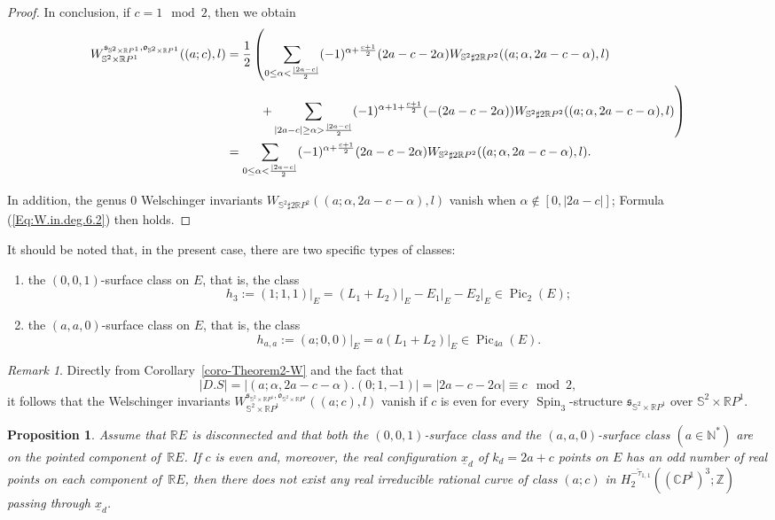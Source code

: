 \documentclass[11pt]{amsart}
\numberwithin{equation}{section}
\theoremstyle{definition}
\theoremstyle{plain}
\newtheorem{proposition}[definition]{Proposition}
\theoremstyle{remark}
\newtheorem{remark}[definition]{Remark}
\newcommand{\R}{\mathbb{R}}
\newcommand{\Z}{\mathbb{Z}}
\newcommand{\C}{\mathbb{C}}
\DeclareMathOperator{\Pic}{Pic}
\DeclareMathOperator{\Spin}{Spin}
\begin{document}
\begin{proof}
In conclusion, if $c= 1 \mod 2$, then we obtain
\begin{align*}
     W_{\mathbb{S}^2 \times \R P^1}^{\mathfrak{s}_{\mathbb{S}^2 \times \R P^1},\mathfrak{o}_{\mathbb{S}^2 \times \R P^1}}((a;c),l)&=\frac{1}{2}\left(\sum_{0\leq \alpha<\frac{|2a-c|}{2}}(-1)^{\alpha +\frac{c+1}{2}} (2a-c-2\alpha) W_{\mathbb{S}^2\sharp 2 {\R P^2}} ((a;\alpha,2a-c-\alpha),l)\right.\\
  &\hphantom{=\frac{1}{2}\Big(}\left.\; + \sum_{|2a-c|\geq \alpha>\frac{|2a-c|}{2}}(-1)^{\alpha +1+\frac{c+1}{2}} (-(2a-c-2\alpha)) W_{\mathbb{S}^2\sharp 2 {\R P^2}} ((a;\alpha,2a-c-\alpha),l) \right)\\
    &=\sum_{0\leq \alpha<\frac{|2a-c|}{2}}(-1)^{\alpha +\frac{c+1}{2}} (2a-c-2\alpha) W_{\mathbb{S}^2\sharp 2 {\R P^2}} ((a;\alpha,2a-c-\alpha),l).
\end{align*}

In addition, the genus $0$ Welschinger invariants $W_{\mathbb{S}^2\sharp 2 {\R P^2}} ((a;\alpha,2a-c-\alpha),l)$ vanish when $\alpha \notin [0,|2a-c|]$;  
Formula (\ref{Eq:W.in.deg.6.2}) then holds.
\end{proof}


It should be noted that, in the present case, there are two specific types of classes:
\begin{enumerate}
    \item the $(0,0,1)$-surface class on $E$, that is, the class $$h_3:=(1;1,1)|_E=(L_1+L_2){|_E}-E_1{|_E}-E_2{|_E}\in \Pic_2(E);$$
\item the $(a,a,0)$-surface class on $E$, that is, the class
$$h_{a,a}:=(a;0,0)|_E=a(L_1+L_2){|_E}\in \Pic_{4a}(E).$$
\end{enumerate}

\begin{remark}\label{remark13}
Directly from Corollary~\ref{coro-Theorem2-W} and the fact that $$|D.S|=|(a;\alpha,2a-c-\alpha).(0;1,-1)|=|2a-c-2\alpha|\equiv  c \mod 2,$$
it follows that the Welschinger invariants $W_{\mathbb{S}^2 \times \R P^1}^{\mathfrak{s}_{\mathbb{S}^2 \times \R P^1},\mathfrak{o}_{\mathbb{S}^2 \times \R P^1}}((a;c),l)$ vanish if $c$ is even for every $\Spin_3$-structure $\mathfrak{s}_{\mathbb{S}^2 \times \R P^1}$ over $\mathbb{S}^2 \times \R P^1$.
\end{remark}


\begin{proposition} \label{prop-application.deg6.2}
Assume that $\R E$ is disconnected and that both the $(0,0,1)$-surface class and the $(a,a,0)$-surface class $(a\in \mathbb{N}^*)$  are on the pointed component of\, $\R E$.     If $c$ is even and, moreover, the real configuration $\underline{x}_d$ of $k_d=2a+c$ points on $E$ has an odd number of real points on each component of\, $\R E$, then there does not exist any real irreducible rational curve of class $(a;c)$ in $H_2^{-\tilde{\tau}_{1,1}}((\C P^1)^3;\Z)$  passing through $\underline{x}_d$. 
\end{proposition}
\end{document}
